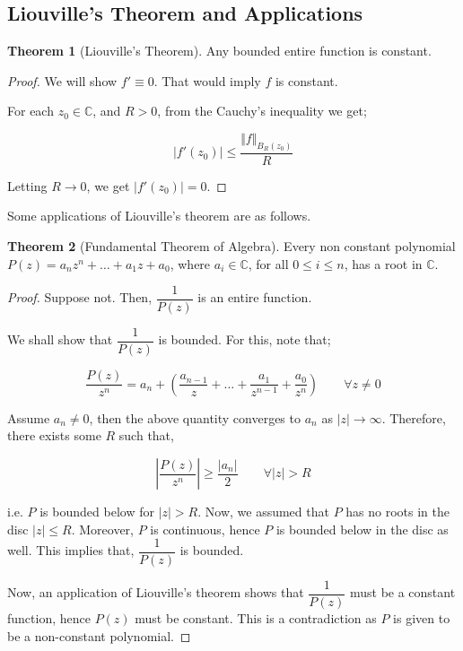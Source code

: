 \documentclass[12pt]{article}
\newcommand{\C}{\mathbb{C}}
\theoremstyle{definition}
\newtheorem{thm}{Theorem}
\newenvironment{theorem}{
\begin{tcolorbox}[colback=green!5!white,colframe=green!75!black, parbox = false]\begin{thm} }{\end{thm}\end{tcolorbox} }
\begin{document}
\subsection{Liouville's Theorem and Applications}

\begin{theorem}[Liouville's Theorem]
    Any bounded entire function is constant.
\end{theorem}

\begin{proof}
    We will show $f' \equiv 0$. That would imply $f$ is constant.

    For each $z_0 \in \C$, and $R > 0$, from the Cauchy's inequality we get;

    $$\vert f'(z_0)\vert \leq \dfrac{\Vert f\Vert_{B_R(z_0)}}{R}$$

    Letting $R \rightarrow 0$, we get $\vert f'(z_0) \vert = 0$.
\end{proof}

Some applications of Liouville's theorem are as follows.

\begin{theorem}[Fundamental Theorem of Algebra]
    Every non constant polynomial $P(z) = a_nz^n + \dots + a_1 z + a_0$, where $a_i \in \C$, for all $0 \leq i \leq n$, has a root in $\C$.
\end{theorem}

\begin{proof}
    Suppose not. Then, $\dfrac{1}{P(z)}$ is an entire function.

    We shall show that $\dfrac{1}{P(z)}$ is bounded. For this, note that;

    $$
    \dfrac{P(z)}{z^n} = a_n + \left( \dfrac{a_{n-1}}{z} + \dots + \dfrac{a_1}{z^{n-1}} + \dfrac{a_0}{z^n}\right) \qquad \forall z \neq 0
    $$

    Assume $a_n \neq 0$, then the above quantity converges to $a_n$ as $\vert z \vert \rightarrow \infty$. Therefore, there exists some $R$ such that,

    $$\left\vert \dfrac{P(z)}{z^n} \right\vert \geq \dfrac{\vert a_n \vert}{2} \qquad \forall \vert z \vert > R$$

    i.e. $P$ is bounded below for $\vert z \vert > R$. Now, we assumed that $P$ has no roots in the disc $\vert z \vert \leq R$. Moreover, $P$ is continuous, hence $P$ is bounded below in the disc as well. This implies that, $\dfrac{1}{P(z)}$ is bounded.

    Now, an application of Liouville's theorem shows that $\dfrac{1}{P(z)}$ must be a constant function, hence $P(z)$ must be constant. This is a contradiction as $P$ is given to be a non-constant polynomial.
\end{proof}
\end{document}
